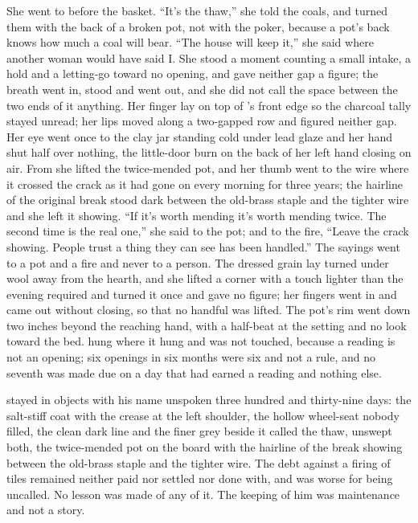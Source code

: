 She went to  before the basket. “It's the thaw,” she told the coals, and turned them with the back of a broken pot, not with the poker, because a pot's back knows how much a coal will bear. “The house will keep it,” she said where another woman would have said I. She stood a moment counting a small intake, a hold and a letting-go toward no opening, and gave neither gap a figure; the breath went in, stood and went out, and she did not call the space between the two ends of it anything. Her finger lay on top of 's front edge so the charcoal tally stayed unread; her lips moved along a two-gapped row and figured neither gap. Her eye went once to the clay jar standing cold under lead glaze and her hand shut half over nothing, the little-door burn on the back of her left hand closing on air. From  she lifted the twice-mended pot, and her thumb went to the wire where it crossed the crack as it had gone on every morning for three years; the hairline of the original break stood dark between the old-brass staple and the tighter wire and she left it showing. “If it's worth mending it's worth mending twice. The second time is the real one,” she said to the pot; and to the fire, “Leave the crack showing. People trust a thing they can see has been handled.” The sayings went to a pot and a fire and never to a person. The dressed grain lay turned under wool away from the hearth, and she lifted a corner with a touch lighter than the evening required and turned it once and gave no figure; her fingers went in and came out without closing, so that no handful was lifted. The pot's rim went down two inches beyond the reaching hand, with a half-beat at the setting and no look toward the bed.  hung where it hung and was not touched, because a reading is not an opening; six openings in six months were six and not a rule, and no seventh was made due on a day that had earned a reading and nothing else.

 stayed in objects with his name unspoken three hundred and thirty-nine days: the salt-stiff coat with the crease at the left shoulder, the hollow wheel-seat nobody filled, the clean dark line and the finer grey beside it called the thaw, unswept both, the twice-mended pot on the board with the hairline of the break showing between the old-brass staple and the tighter wire. The debt against a firing of tiles remained neither paid nor settled nor done with, and was worse for being uncalled. No lesson was made of any of it. The keeping of him was maintenance and not a story.

